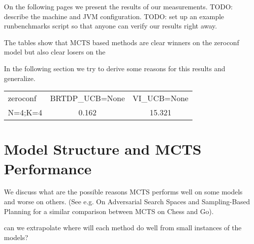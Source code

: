 On the following pages we present the results of our measurements. TODO:
describe the machine and JVM configuration. TODO: set up an example
runbenchmarks script so that anyone can verify our results right away.

The tables show that MCTS based methods are clear winners on the
zeroconf model but also clear losers on the

In the following section we try to derive some reasons for this results
and generalize.

\begin{landscape}
\begin{tabular}{ l  | c | c  }
zeroconf   &    BRTDP\_UCB=None    &     VI\_UCB=None      \\
N=4;K=4    &                0.162 &               15.321 \\
\end{tabular}
\end{landscape}

\section{Model Structure and MCTS Performance}

We discuss what are the possible reasons MCTS performs well on some
models and worse on others. (See e.g. On Adversarial Search Spaces and
Sampling-Based Planning for a similar comparison between MCTS on Chess
and Go).

can we extrapolate where will each method do well from small instances of the models?
